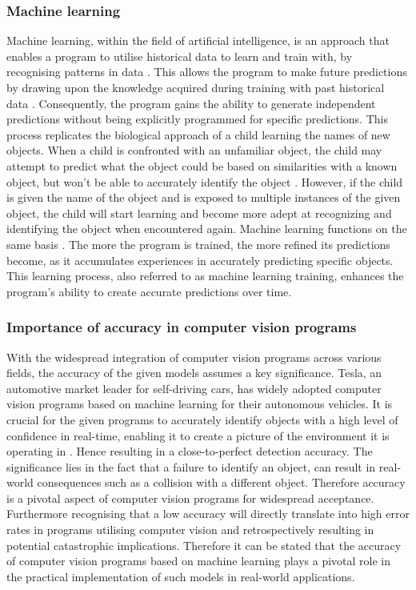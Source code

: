\subsubsection{Machine learning }
Machine learning, within the field of artificial intelligence, is an approach that enables a program to utilise historical data to learn and train with, by recognising patterns in data \parencite{Zhou2021}. This allows the program to make future predictions by drawing upon the knowledge acquired during training with past historical data \parencite{Mitchell1983}. Consequently, the program gains the ability to generate independent predictions without being explicitly programmed for specific predictions. This process replicates the biological approach of a child learning the names of new objects. When a child is confronted with an unfamiliar object, the child may attempt to predict what the object could be based on similarities with a known object, but won't be able to accurately identify the object \parencite{Harrington2012}. However,  if the child is given the name of the object and is exposed to multiple instances of the given object, the child will start learning and become more adept at recognizing and identifying the object when encountered again. Machine learning functions on the same basis \parencite{Gollapudi2016}. The more the program is trained, the more refined its predictions become, as it accumulates experiences in accurately predicting specific objects. This learning process, also referred to as machine learning training, enhances the program's ability to create accurate predictions over time. 

\subsubsection{Importance of accuracy in computer vision programs}
With the widespread integration of computer vision programs across various fields, the accuracy of the given models assumes a key significance. Tesla, an automotive market leader for self-driving cars, has widely adopted computer vision programs based on machine learning for their autonomous vehicles. It is crucial for the given programs to accurately identify objects with a high level of confidence in real-time, enabling it to create a picture of the environment it is operating in \parencite{Baeldung2022}. Hence resulting in a close-to-perfect detection accuracy. The significance lies in the fact that a failure to identify an object, can result in real-world consequences such as a collision with a different object. Therefore accuracy is a pivotal aspect of computer vision programs for widespread acceptance. Furthermore recognising that a low accuracy will directly translate into high error rates in programs utilising computer vision and retrospectively resulting in potential catastrophic implications. Therefore it can be stated that the accuracy of computer vision programs based on machine learning plays a pivotal role in the practical implementation of such models in real-world applications. 


